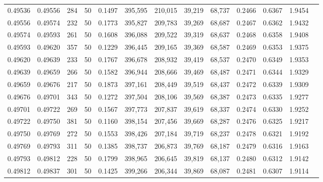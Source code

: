 \begin{tabular}{rrrrrrrrrrrrr}
0.49536 & 0.49556 &   284 &  50 &                                     0.1497 & 395,595 & 210,015 &  39,219 &  68,737 & 0.2466 & 0.6367 & 1.9454 \\
0.49556 & 0.49574 &   232 &  50 &                                     0.1773 & 395,827 & 209,783 &  39,269 &  68,687 & 0.2467 & 0.6362 & 1.9432 \\
0.49574 & 0.49593 &   261 &  50 &                                     0.1608 & 396,088 & 209,522 &  39,319 &  68,637 & 0.2468 & 0.6358 & 1.9408 \\
0.49593 & 0.49620 &   357 &  50 &                                     0.1229 & 396,445 & 209,165 &  39,369 &  68,587 & 0.2469 & 0.6353 & 1.9375 \\
0.49620 & 0.49639 &   233 &  50 &                                     0.1767 & 396,678 & 208,932 &  39,419 &  68,537 & 0.2470 & 0.6349 & 1.9353 \\
0.49639 & 0.49659 &   266 &  50 &                                     0.1582 & 396,944 & 208,666 &  39,469 &  68,487 & 0.2471 & 0.6344 & 1.9329 \\
0.49659 & 0.49676 &   217 &  50 &                                     0.1873 & 397,161 & 208,449 &  39,519 &  68,437 & 0.2472 & 0.6339 & 1.9309 \\
0.49676 & 0.49701 &   343 &  50 &                                     0.1272 & 397,504 & 208,106 &  39,569 &  68,387 & 0.2473 & 0.6335 & 1.9277 \\
0.49701 & 0.49722 &   269 &  50 &                                     0.1567 & 397,773 & 207,837 &  39,619 &  68,337 & 0.2474 & 0.6330 & 1.9252 \\
0.49722 & 0.49750 &   381 &  50 &                                     0.1160 & 398,154 & 207,456 &  39,669 &  68,287 & 0.2476 & 0.6325 & 1.9217 \\
0.49750 & 0.49769 &   272 &  50 &                                     0.1553 & 398,426 & 207,184 &  39,719 &  68,237 & 0.2478 & 0.6321 & 1.9192 \\
0.49769 & 0.49793 &   311 &  50 &                                     0.1385 & 398,737 & 206,873 &  39,769 &  68,187 & 0.2479 & 0.6316 & 1.9163 \\
0.49793 & 0.49812 &   228 &  50 &                                     0.1799 & 398,965 & 206,645 &  39,819 &  68,137 & 0.2480 & 0.6312 & 1.9142 \\
0.49812 & 0.49837 &   301 &  50 &                                     0.1425 & 399,266 & 206,344 &  39,869 &  68,087 & 0.2481 & 0.6307 & 1.9114 \\

\end{tabular}
